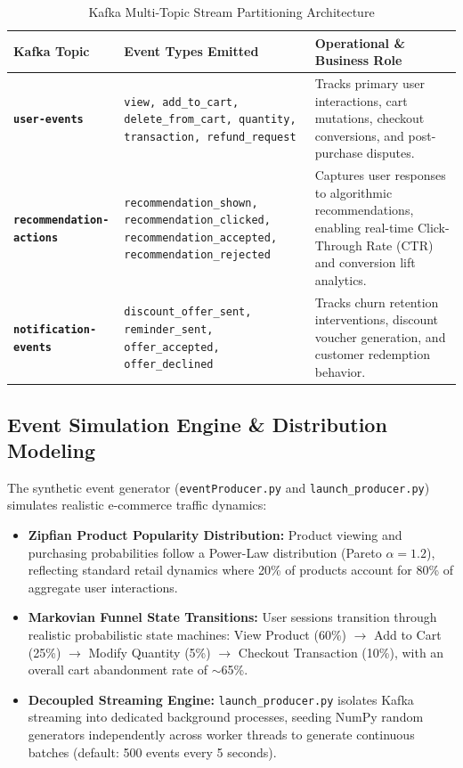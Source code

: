 \documentclass[11pt,a4paper]{article}
\begin{document}
\begin{table}[h]
\centering
\small
\begin{tabularx}{\textwidth}{@{}>{\bfseries}p{3.5cm}p{4.2cm}X@{}}
\toprule
\color{DeepNavy}Kafka Topic & \color{DeepNavy}Event Types Emitted & \color{DeepNavy}Operational \& Business Role \\
\midrule
\texttt{user-events} & \texttt{view, add\_to\_cart, delete\_from\_cart, quantity, transaction, refund\_request} & Tracks primary user interactions, cart mutations, checkout conversions, and post-purchase disputes. \\
\addlinespace
\texttt{recommendation-actions} & \texttt{recommendation\_shown, recommendation\_clicked, recommendation\_accepted, recommendation\_rejected} & Captures user responses to algorithmic recommendations, enabling real-time Click-Through Rate (CTR) and conversion lift analytics. \\
\addlinespace
\texttt{notification-events} & \texttt{discount\_offer\_sent, reminder\_sent, offer\_accepted, offer\_declined} & Tracks churn retention interventions, discount voucher generation, and customer redemption behavior. \\
\bottomrule
\end{tabularx}
\caption{Kafka Multi-Topic Stream Partitioning Architecture}
\end{table}

\subsection{Event Simulation Engine \& Distribution Modeling}
The synthetic event generator (\texttt{eventProducer.py} and \texttt{launch\_producer.py}) simulates realistic e-commerce traffic dynamics:
\begin{itemize}
    \item \textbf{Zipfian Product Popularity Distribution:} Product viewing and purchasing probabilities follow a Power-Law distribution (Pareto $\alpha = 1.2$), reflecting standard retail dynamics where 20\% of products account for 80\% of aggregate user interactions.
    \item \textbf{Markovian Funnel State Transitions:} User sessions transition through realistic probabilistic state machines: View Product (60\%) $\rightarrow$ Add to Cart (25\%) $\rightarrow$ Modify Quantity (5\%) $\rightarrow$ Checkout Transaction (10\%), with an overall cart abandonment rate of $\sim$65\%.
    \item \textbf{Decoupled Streaming Engine:} \texttt{launch\_producer.py} isolates Kafka streaming into dedicated background processes, seeding NumPy random generators independently across worker threads to generate continuous batches (default: 500 events every 5 seconds).
\end{itemize}
\end{document}
